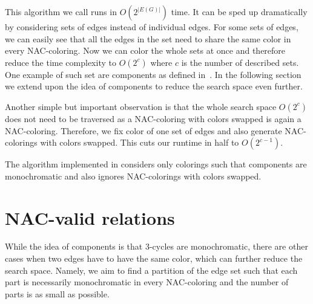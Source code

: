 This algorithm we call \Naive{} runs in \( O(2^{|E(G)|}) \) time.
It can be sped up dramatically by considering sets of edges instead of individual edges.
For some sets of edges, we can easily see that all the edges in the set need to share
the same color in every NAC-coloring.
Now we can color the whole sets at once
and therefore reduce the time complexity to \( O(2^{c}) \)
where \( c \) is the number of described sets.
One example of such set are \trcon{} components
as defined in~.
In the following section we extend upon the idea of \trcon{} components
to reduce the search space even further.

Another simple but important observation is that the whole search space \( O(2^{c}) \)
does not need to be traversed as a NAC-coloring with colors swapped is again a NAC-coloring.
Therefore, we fix color of one set of edges and also generate NAC-colorings with colors swapped.
This cuts our runtime in half to \( O(2^{c-1}) \).

The algorithm implemented in \flexrilog{}
considers only colorings such that \trcon{} components are monochromatic
and also ignores NAC-colorings with colors swapped.

\section{NAC-valid relations}%
\label{sec:NACvalid}

While the idea of \trcon{} components is that 3-cycles are monochromatic,
there are other cases when two edges have to have the same color,
which can further reduce the search space.
Namely, we aim to find a partition of the edge set such that each part is necessarily monochromatic
in every NAC-coloring and the number of parts is as small as possible.

